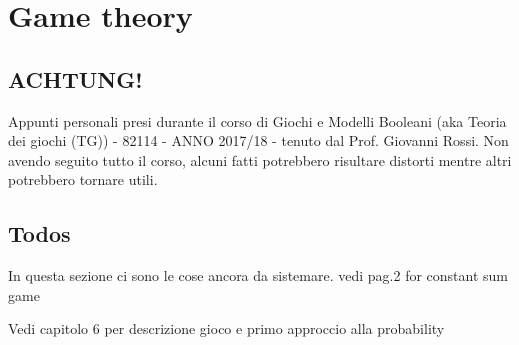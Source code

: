 \chapter{Game theory}

\section{ACHTUNG!}

Appunti personali presi durante il corso di Giochi e Modelli Booleani (aka Teoria dei giochi (TG)) - 82114 - ANNO 2017/18 - tenuto dal Prof. Giovanni Rossi. Non avendo seguito tutto il corso, alcuni fatti potrebbero risultare distorti mentre altri potrebbero tornare utili.

\section{Todos}
In questa sezione ci sono le cose ancora da sistemare.
vedi \cite{vorobev01} pag.2 for constant sum game

Vedi capitolo 6 per descrizione gioco e primo approccio alla probability



%





%
%
%
%



%
%
%
%
%
%








